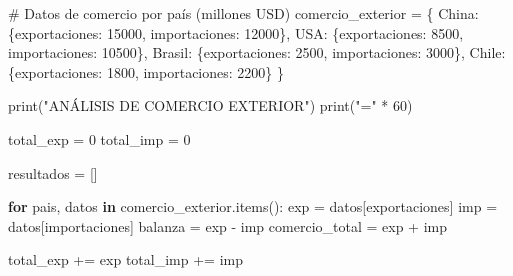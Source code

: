 \documentclass[
  doc,
  floatsintext,
  longtable,
  a4paper,
  nolmodern,
  notxfonts,
  notimes,
  12pt,
  colorlinks=true,linkcolor=blue,citecolor=blue,urlcolor=blue]{apa7}
\newenvironment{Shaded}{\begin{snugshade}}{\end{snugshade}}
\newcommand{\BuiltInTok}[1]{\textcolor[rgb]{0.00,0.23,0.31}{#1}}
\newcommand{\CommentTok}[1]{\textcolor[rgb]{0.37,0.37,0.37}{#1}}
\newcommand{\ControlFlowTok}[1]{\textcolor[rgb]{0.00,0.23,0.31}{\textbf{#1}}}
\newcommand{\DecValTok}[1]{\textcolor[rgb]{0.68,0.00,0.00}{#1}}
\newcommand{\KeywordTok}[1]{\textcolor[rgb]{0.00,0.23,0.31}{\textbf{#1}}}
\newcommand{\NormalTok}[1]{\textcolor[rgb]{0.00,0.23,0.31}{#1}}
\newcommand{\OperatorTok}[1]{\textcolor[rgb]{0.37,0.37,0.37}{#1}}
\newcommand{\StringTok}[1]{\textcolor[rgb]{0.13,0.47,0.30}{#1}}
\begin{document}
\begin{Shaded}
\begin{Highlighting}[]
\CommentTok{\# Datos de comercio por país (millones USD)}
\NormalTok{comercio\_exterior }\OperatorTok{=}\NormalTok{ \{}
    \StringTok{\textquotesingle{}China\textquotesingle{}}\NormalTok{: \{}\StringTok{\textquotesingle{}exportaciones\textquotesingle{}}\NormalTok{: }\DecValTok{15000}\NormalTok{, }\StringTok{\textquotesingle{}importaciones\textquotesingle{}}\NormalTok{: }\DecValTok{12000}\NormalTok{\},}
    \StringTok{\textquotesingle{}USA\textquotesingle{}}\NormalTok{: \{}\StringTok{\textquotesingle{}exportaciones\textquotesingle{}}\NormalTok{: }\DecValTok{8500}\NormalTok{, }\StringTok{\textquotesingle{}importaciones\textquotesingle{}}\NormalTok{: }\DecValTok{10500}\NormalTok{\},}
    \StringTok{\textquotesingle{}Brasil\textquotesingle{}}\NormalTok{: \{}\StringTok{\textquotesingle{}exportaciones\textquotesingle{}}\NormalTok{: }\DecValTok{2500}\NormalTok{, }\StringTok{\textquotesingle{}importaciones\textquotesingle{}}\NormalTok{: }\DecValTok{3000}\NormalTok{\},}
    \StringTok{\textquotesingle{}Chile\textquotesingle{}}\NormalTok{: \{}\StringTok{\textquotesingle{}exportaciones\textquotesingle{}}\NormalTok{: }\DecValTok{1800}\NormalTok{, }\StringTok{\textquotesingle{}importaciones\textquotesingle{}}\NormalTok{: }\DecValTok{2200}\NormalTok{\}}
\NormalTok{\}}

\BuiltInTok{print}\NormalTok{(}\StringTok{"ANÁLISIS DE COMERCIO EXTERIOR"}\NormalTok{)}
\BuiltInTok{print}\NormalTok{(}\StringTok{"="} \OperatorTok{*} \DecValTok{60}\NormalTok{)}

\NormalTok{total\_exp }\OperatorTok{=} \DecValTok{0}
\NormalTok{total\_imp }\OperatorTok{=} \DecValTok{0}

\NormalTok{resultados }\OperatorTok{=}\NormalTok{ []}

\ControlFlowTok{for}\NormalTok{ pais, datos }\KeywordTok{in}\NormalTok{ comercio\_exterior.items():}
\NormalTok{    exp }\OperatorTok{=}\NormalTok{ datos[}\StringTok{\textquotesingle{}exportaciones\textquotesingle{}}\NormalTok{]}
\NormalTok{    imp }\OperatorTok{=}\NormalTok{ datos[}\StringTok{\textquotesingle{}importaciones\textquotesingle{}}\NormalTok{]}
\NormalTok{    balanza }\OperatorTok{=}\NormalTok{ exp }\OperatorTok{{-}}\NormalTok{ imp}
\NormalTok{    comercio\_total }\OperatorTok{=}\NormalTok{ exp }\OperatorTok{+}\NormalTok{ imp}
    
\NormalTok{    total\_exp }\OperatorTok{+=}\NormalTok{ exp}
\NormalTok{    total\_imp }\OperatorTok{+=}\NormalTok{ imp}
    

\end{Highlighting}
\end{Shaded}
\end{document}
